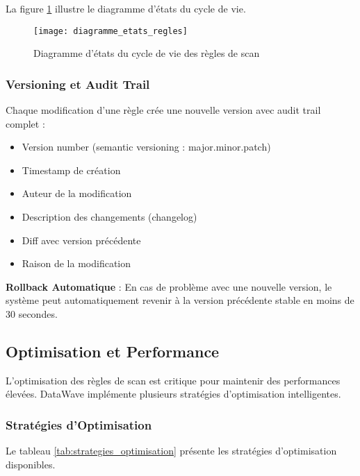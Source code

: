 La figure \ref{fig:diagramme_etats} illustre le diagramme d'états du cycle de vie.

\begin{figure}[htpb]
\centering
\texttt{[image: diagramme\_etats\_regles]}
\caption{Diagramme d'états du cycle de vie des règles de scan}
\label{fig:diagramme_etats}
\end{figure}

\subsubsection{Versioning et Audit Trail}

Chaque modification d'une règle crée une nouvelle version avec audit trail complet :
\begin{itemize}
    \item Version number (semantic versioning : major.minor.patch)
    \item Timestamp de création
    \item Auteur de la modification
    \item Description des changements (changelog)
    \item Diff avec version précédente
    \item Raison de la modification
\end{itemize}

\textbf{Rollback Automatique} : En cas de problème avec une nouvelle version, le système peut automatiquement revenir à la version précédente stable en moins de 30 secondes.

\subsection{Optimisation et Performance}

L'optimisation des règles de scan est critique pour maintenir des performances élevées. DataWave implémente plusieurs stratégies d'optimisation intelligentes.

\subsubsection{Stratégies d'Optimisation}

Le tableau \ref{tab:strategies_optimisation} présente les stratégies d'optimisation disponibles.

